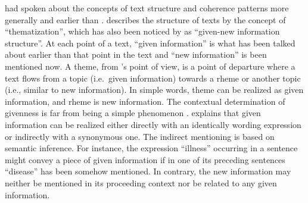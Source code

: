  had spoken about the concepts of text structure and coherence patterns more generally and earlier than . 
 describes the structure of texts by the concept of ``thematization'', which has also been noticed by  as ``given-new information structure''. 
At each point of a text, ``given information'' is what has been talked about earlier than that point in the text and ``new information'' is been mentioned now.  
A theme, from 's point of view, is a point of departure where a text flows from a topic (i.e.\ given information) towards a rheme or another topic (i.e., similar to new information). 
In simple words, theme can be realized as given information, and rheme is new information. 
The contextual determination of givenness is far from being a simple phenomenon \cite{danes74a}. 
 explains that given information can be realized either directly with an identically wording expression or indirectly with a synonymous one. 
The indirect mentioning is based on semantic inference. 
For instance, the expression ``illness'' occurring in a sentence might convey a piece of given information if in one of its preceding sentences ``disease'' has been somehow mentioned. 
In contrary, the new information may neither be mentioned in its proceeding context nor be related to any given information. 

